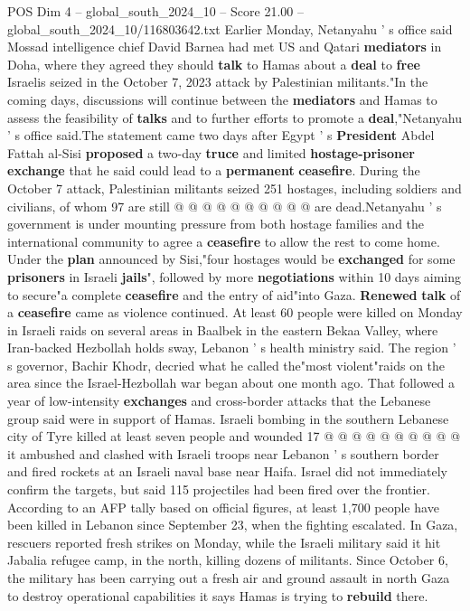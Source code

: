 \begin{textsample}{POS Dim 4 – global\_south\_2024\_10 – Score 21.00 – global\_south\_2024\_10/116803642.txt}
Earlier Monday, Netanyahu ' s office said Mossad intelligence chief David Barnea had met US and Qatari \textbf{mediators} in Doha, where they agreed they should \textbf{talk} to Hamas about a \textbf{deal} to \textbf{free} Israelis seized in the October 7, 2023 attack by Palestinian militants."In the coming days, discussions will continue between the \textbf{mediators} and Hamas to assess the feasibility of \textbf{talks} and to further efforts to promote a \textbf{deal},"Netanyahu ' s office said.The statement came two days after Egypt ' s \textbf{President} Abdel Fattah al-Sisi \textbf{proposed} a two-day \textbf{truce} and limited \textbf{hostage-prisoner} \textbf{exchange} that he said could lead to a \textbf{permanent} \textbf{ceasefire}.
During the October 7 attack, Palestinian militants seized 251 hostages, including soldiers and civilians, of whom 97 are still @ @ @ @ @ @ @ @ @ @ are dead.Netanyahu ' s government is under mounting pressure from both hostage families and the international community to agree a \textbf{ceasefire} to allow the rest to come home.
Under the \textbf{plan} announced by Sisi,"four hostages would be \textbf{exchanged} for some \textbf{prisoners} in Israeli \textbf{jails}", followed by more \textbf{negotiations} within 10 days aiming to secure"a complete \textbf{ceasefire} and the entry of aid"into Gaza. \textbf{Renewed} \textbf{talk} of a \textbf{ceasefire} came as violence continued.
At least 60 people were killed on Monday in Israeli raids on several areas in Baalbek in the eastern Bekaa Valley, where Iran-backed Hezbollah holds sway, Lebanon ' s health ministry said.
The region ' s governor, Bachir Khodr, decried what he called the"most violent"raids on the area since the Israel-Hezbollah war began about one month ago.
That followed a year of low-intensity \textbf{exchanges} and cross-border attacks that the Lebanese group said were in support of Hamas.
Israeli bombing in the southern Lebanese city of Tyre killed at least seven people and wounded 17 @ @ @ @ @ @ @ @ @ @ it ambushed and clashed with Israeli troops near Lebanon ' s southern border and fired rockets at an Israeli naval base near Haifa.
Israel did not immediately confirm the targets, but said 115 projectiles had been fired over the frontier.
According to an AFP tally based on official figures, at least 1,700 people have been killed in Lebanon since September 23, when the fighting escalated.
In Gaza, rescuers reported fresh strikes on Monday, while the Israeli military said it hit Jabalia refugee camp, in the north, killing dozens of militants.
Since October 6, the military has been carrying out a fresh air and ground assault in north Gaza to destroy operational capabilities it says Hamas is trying to \textbf{rebuild} there.

\end{textsample}
